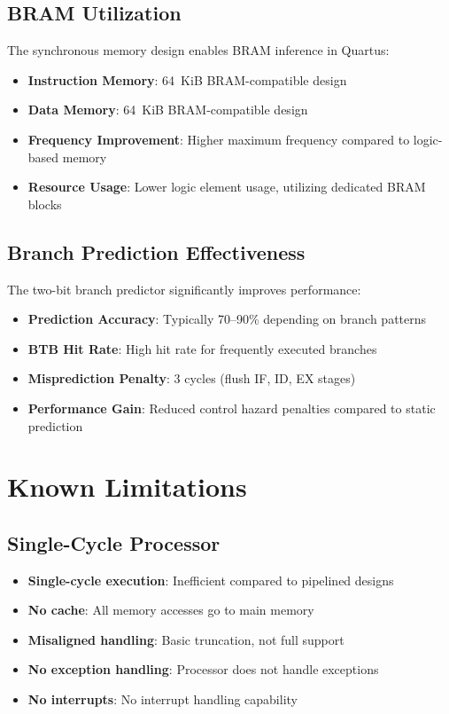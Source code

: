 \subsection{BRAM Utilization}

The synchronous memory design enables BRAM inference in Quartus:

\begin{itemize}
    \item \textbf{Instruction Memory}: 64~KiB BRAM-compatible design
    \item \textbf{Data Memory}: 64~KiB BRAM-compatible design
    \item \textbf{Frequency Improvement}: Higher maximum frequency compared to logic-based memory
    \item \textbf{Resource Usage}: Lower logic element usage, utilizing dedicated BRAM blocks
\end{itemize}

\subsection{Branch Prediction Effectiveness}

The two-bit branch predictor significantly improves performance:

\begin{itemize}
    \item \textbf{Prediction Accuracy}: Typically 70--90\% depending on branch patterns
    \item \textbf{BTB Hit Rate}: High hit rate for frequently executed branches
    \item \textbf{Misprediction Penalty}: 3 cycles (flush IF, ID, EX stages)
    \item \textbf{Performance Gain}: Reduced control hazard penalties compared to static prediction
\end{itemize}

\section{Known Limitations}

\subsection{Single-Cycle Processor}

\begin{itemize}
    \item \textbf{Single-cycle execution}: Inefficient compared to pipelined designs
    \item \textbf{No cache}: All memory accesses go to main memory
    \item \textbf{Misaligned handling}: Basic truncation, not full support
    \item \textbf{No exception handling}: Processor does not handle exceptions
    \item \textbf{No interrupts}: No interrupt handling capability
\end{itemize}

